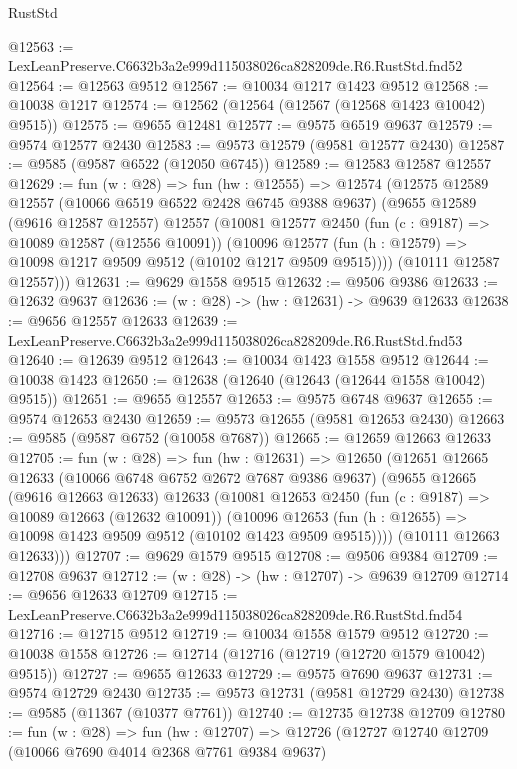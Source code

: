 \begin{lexlean}{RustStd}
\begin{coremodule}
@12563 := LexLeanPreserve.C6632b3a2e999d115038026ca828209de.R6.RustStd.fnd52
@12564 := @12563 @9512
@12567 := @10034 @1217 @1423 @9512
@12568 := @10038 @1217
@12574 := @12562 (@12564 (@12567 (@12568 @1423 @10042) @9515))
@12575 := @9655 @12481
@12577 := @9575 @6519 @9637
@12579 := @9574 @12577 @2430
@12583 := @9573 @12579 (@9581 @12577 @2430)
@12587 := @9585 (@9587 @6522 (@12050 @6745))
@12589 := @12583 @12587 @12557
@12629 := fun (w : @28) =>
  fun (hw : @12555) =>
  @12574
    (@12575
      @12589
      @12557
      (@10066 @6519 @6522 @2428 @6745 @9388 @9637)
      (@9655
        @12589
        (@9616 @12587 @12557)
        @12557
        (@10081
          @12577
          @2450
          (fun (c : @9187) => @10089 @12587 (@12556 @10091))
          (@10096 @12577 (fun (h : @12579) => @10098 @1217 @9509 @9512 (@10102 @1217 @9509 @9515))))
        (@10111 @12587 @12557)))
@12631 := @9629 @1558 @9515
@12632 := @9506 @9386
@12633 := @12632 @9637
@12636 := (w : @28) -> (hw : @12631) -> @9639 @12633
@12638 := @9656 @12557 @12633
@12639 := LexLeanPreserve.C6632b3a2e999d115038026ca828209de.R6.RustStd.fnd53
@12640 := @12639 @9512
@12643 := @10034 @1423 @1558 @9512
@12644 := @10038 @1423
@12650 := @12638 (@12640 (@12643 (@12644 @1558 @10042) @9515))
@12651 := @9655 @12557
@12653 := @9575 @6748 @9637
@12655 := @9574 @12653 @2430
@12659 := @9573 @12655 (@9581 @12653 @2430)
@12663 := @9585 (@9587 @6752 (@10058 @7687))
@12665 := @12659 @12663 @12633
@12705 := fun (w : @28) =>
  fun (hw : @12631) =>
  @12650
    (@12651
      @12665
      @12633
      (@10066 @6748 @6752 @2672 @7687 @9386 @9637)
      (@9655
        @12665
        (@9616 @12663 @12633)
        @12633
        (@10081
          @12653
          @2450
          (fun (c : @9187) => @10089 @12663 (@12632 @10091))
          (@10096 @12653 (fun (h : @12655) => @10098 @1423 @9509 @9512 (@10102 @1423 @9509 @9515))))
        (@10111 @12663 @12633)))
@12707 := @9629 @1579 @9515
@12708 := @9506 @9384
@12709 := @12708 @9637
@12712 := (w : @28) -> (hw : @12707) -> @9639 @12709
@12714 := @9656 @12633 @12709
@12715 := LexLeanPreserve.C6632b3a2e999d115038026ca828209de.R6.RustStd.fnd54
@12716 := @12715 @9512
@12719 := @10034 @1558 @1579 @9512
@12720 := @10038 @1558
@12726 := @12714 (@12716 (@12719 (@12720 @1579 @10042) @9515))
@12727 := @9655 @12633
@12729 := @9575 @7690 @9637
@12731 := @9574 @12729 @2430
@12735 := @9573 @12731 (@9581 @12729 @2430)
@12738 := @9585 (@11367 (@10377 @7761))
@12740 := @12735 @12738 @12709
@12780 := fun (w : @28) =>
  fun (hw : @12707) =>
  @12726
    (@12727
      @12740
      @12709
      (@10066 @7690 @4014 @2368 @7761 @9384 @9637)

\end{coremodule}
\end{lexlean}
